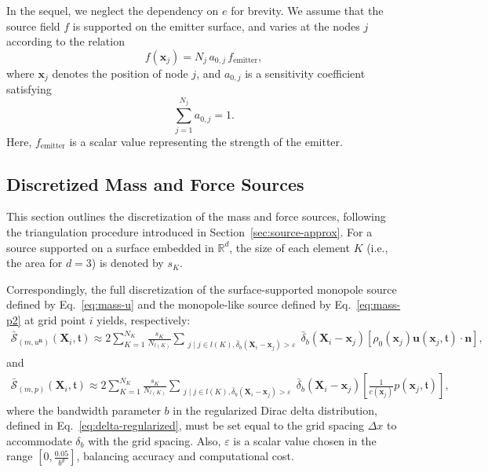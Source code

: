 \documentclass[11pt,reqno]{amsart}
\theoremstyle{remark}
\theoremstyle{italic_lemma}
\newcommand{\eps}{\varepsilon}
\newcommand{\bt}{\mathfrak{t}}
\newcommand{\bx}{\boldsymbol{x}}
\newcommand{\bu}{\boldsymbol{u}}
\newcommand{\bX}{\boldsymbol{X}}
\newcommand{\bn}{\boldsymbol{n}}
\begin{document}
\noindent
In the sequel, we neglect the dependency on \( e \) for brevity.
 We assume that the source field \( f \) is supported on the emitter surface, and varies at the nodes \( j \) according to the relation
\[
f(\bx_j) = N_j \, a_{0,j} \, f_{\mathrm{emitter}},
\]
where \( \bx_j \) denotes the position of node \( j \), and \( a_{0,j} \) is a sensitivity coefficient satisfying
\[
\sum_{j=1}^{N_j} a_{0,j} = 1.
\]
Here, \( f_{\mathrm{emitter}} \) is a scalar value representing the strength of the emitter.






\subsection{Discretized Mass and Force Sources} \label{sec:dis-mass&force}

This section outlines the discretization of the mass and force sources, following the triangulation procedure introduced in Section~\ref{sec:source-approx}. For a source supported on a surface embedded in \( \mathbb{R}^d \), the size of each element \( K \) (i.e., the area for \( d=3 \)) is denoted by \( s_K \).


\noindent
Correspondingly, the full discretization of the surface-supported monopole source defined by Eq.~\eqref{eq:mass-u} and the monopole-like source defined by Eq.~\eqref{eq:mass-p2} at grid point \( i \) yields, respectively:
\begin{align}  \label{eq:mass-u-dis}
    \bar{\mathcal{S}}_{(m,u^{\bn})}(\bX_i, \bt) \approx  2 \sum_{K=1}^{N_K}  \frac{s_K}{N_{l(K)}}
    \sum_{\substack{j \mid  j \in l(K), \bar{\delta}_b(\bX_i- \bx_j) >  \eps }} \bar{\delta}_b(\bX_i - \bx_j)  
    \left[ \rho_0(\bx_j) \bu(\bx_j, \bt) \cdot \bn \right],
\end{align}
and
\begin{align}  \label{eq:mass-p2-dis}
    \bar{\mathcal{S}}_{(m,p)}(\bX_i, \bt) \approx 2 \sum_{K=1}^{N_K}  \frac{s_K}{N_{l(K)}}  
    \sum_{\substack{j \mid j \in l(K), \bar{\delta}_b(\bX_i- \bx_j) > \eps }} \bar{\delta}_b(\bX_i - \bx_j) 
    \left[ \frac{1}{c(\bx_j)} p(\bx_j, \bt) \right],
\end{align}
where the bandwidth parameter \(b\) in the regularized Dirac delta distribution, defined in Eq.~\eqref{eq:delta-regularized}, must be set equal to the grid spacing \(\Delta x\) to accommodate \(\delta_b\) with the grid spacing. Also, $\varepsilon$ is a scalar value chosen in the range \([0, \frac{0.05}{b^d}]\), balancing accuracy and computational cost. 
\end{document}

